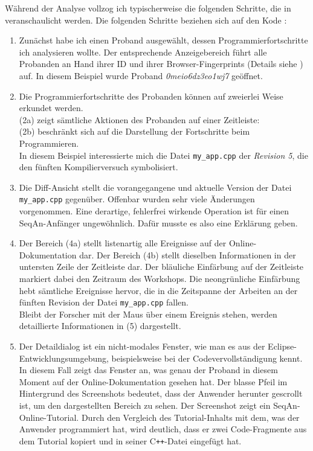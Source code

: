 Während der Analyse vollzog ich typischerweise die folgenden Schritte, die in  veranschaulicht werden. Die folgenden Schritte beziehen sich auf den Kode :
\begin{enumerate}
  \item Zunächst habe ich einen Proband ausgewählt, dessen Programmierfortschritte ich analysieren wollte. Der entsprechende Anzeigebereich führt alle Probanden an Hand ihrer ID und ihrer Browser-Fingerprints (Details siehe ) auf. In diesem Beispiel wurde Proband \textit{0meio6dz3eo1wj7} geöffnet.
  \item Die Programmierfortschritte des Probanden können auf zweierlei Weise erkundet werden.
  \\(2a) zeigt sämtliche Aktionen des Probanden auf einer Zeitleiste:
  \\(2b) beschränkt sich auf die Darstellung der Fortschritte beim Programmieren.
  \\In diesem Beispiel interessierte mich die Datei \texttt{my\_app.cpp} der \textit{Revision 5}, die den fünften Kompilierversuch symbolisiert.
  \item Die Diff-Ansicht stellt die vorangegangene und aktuelle Version der Datei \texttt{my\_app.cpp} gegenüber. Offenbar wurden sehr viele Änderungen vorgenommen. Eine derartige, fehlerfrei wirkende Operation ist für einen SeqAn-Anfänger ungewöhnlich. Dafür musste es also eine Erklärung geben.
  \item Der Bereich (4a) stellt listenartig alle Ereignisse auf der Online-Dokumentation dar. Der Bereich (4b) stellt dieselben Informationen in der untersten Zeile der Zeitleiste dar. Der bläuliche Einfärbung auf der Zeitleiste markiert dabei den Zeitraum des Workshops. Die neongrünliche Einfärbung hebt sämtliche Ereignisse hervor, die in die Zeitspanne der Arbeiten an der fünften Revision der Datei \texttt{my\_app.cpp} fallen.
  \\Bleibt der Forscher mit der Maus über einem Ereignis stehen, werden detaillierte Informationen in (5) dargestellt.
  \item Der Detaildialog ist ein nicht-modales Fenster, wie man es aus der Eclipse-Entwicklungsumgebung, beispielsweise bei der Codevervollständigung kennt. In diesem Fall zeigt das Fenster an, was genau der Proband in diesem Moment auf der Online-Dokumentation gesehen hat. Der blasse Pfeil im Hintergrund des Screenshots bedeutet, dass der Anwender herunter gescrollt ist, um den dargestellten Bereich zu sehen. Der Screenshot zeigt ein SeqAn-Online-Tutorial. Durch den Vergleich des Tutorial-Inhalts mit dem, was der Anwender programmiert hat, wird deutlich, dass er zwei Code-Fragmente aus dem Tutorial kopiert und in seiner C{}\verb$++$-Datei eingefügt hat.

\end{enumerate}

